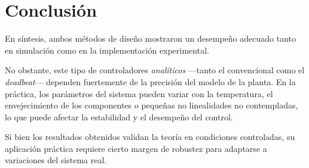 \section{Conclusión}
\begin{table}[H]
	\centering
	
	\vline
	\caption{Comparación entre simulación y medición para ambos métodos}
	\label{tab:comparacion}
\end{table}
En síntesis, ambos métodos de diseño mostraron un desempeño adecuado tanto en simulación como en la implementación experimental.  

No obstante, este tipo de controladores \textit{analíticos} —tanto el convencional como el \textit{deadbeat}— dependen fuertemente de la precisión del modelo de la planta.  
En la práctica, los parámetros del sistema pueden variar con la temperatura, el envejecimiento de los componentes o pequeñas no linealidades no contempladas, lo que puede afectar la estabilidad y el desempeño del control.  

Si bien los resultados obtenidos validan la teoría en condiciones controladas, su aplicación práctica requiere cierto margen de robustez para adaptarse a variaciones del sistema real.
